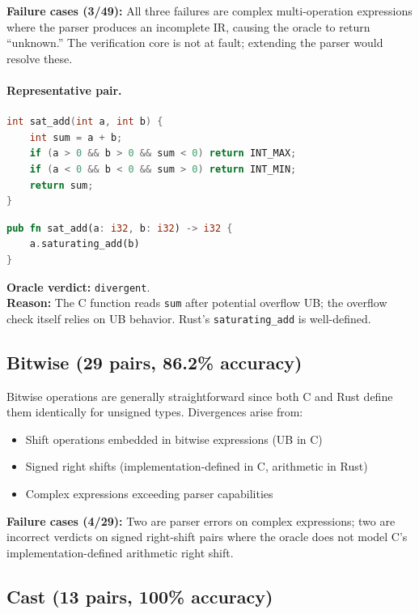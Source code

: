 \documentclass[11pt]{article}
\begin{document}
\textbf{Failure cases (3/49):}
All three failures are complex multi-operation expressions where the parser
produces an incomplete IR, causing the oracle to return ``unknown.''  The
verification core is not at fault; extending the parser would resolve these.

\paragraph{Representative pair.}
\begin{lstlisting}[language=C,caption={C: saturating addition.}]
int sat_add(int a, int b) {
    int sum = a + b;
    if (a > 0 && b > 0 && sum < 0) return INT_MAX;
    if (a < 0 && b < 0 && sum > 0) return INT_MIN;
    return sum;
}
\end{lstlisting}

\begin{lstlisting}[language=Rust,caption={Rust: saturating addition.}]
pub fn sat_add(a: i32, b: i32) -> i32 {
    a.saturating_add(b)
}
\end{lstlisting}

\noindent\textbf{Oracle verdict:} \texttt{divergent}.\\
\textbf{Reason:} The C function reads \texttt{sum} after potential overflow
UB; the overflow check itself relies on UB behavior.  Rust's
\texttt{saturating\_add} is well-defined.

\subsection{Bitwise (29 pairs, 86.2\% accuracy)}

Bitwise operations are generally straightforward since both C and Rust define
them identically for unsigned types.  Divergences arise from:
\begin{itemize}[nosep]
\item Shift operations embedded in bitwise expressions (UB in C)
\item Signed right shifts (implementation-defined in C, arithmetic in Rust)
\item Complex expressions exceeding parser capabilities
\end{itemize}

\textbf{Failure cases (4/29):}
Two are parser errors on complex expressions; two are incorrect verdicts on
signed right-shift pairs where the oracle does not model C's
implementation-defined arithmetic right shift.

\subsection{Cast (13 pairs, 100\% accuracy)}
\end{document}
